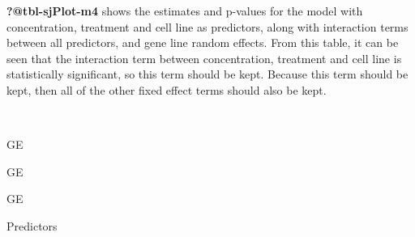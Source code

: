 \documentclass[
  letterpaper,
  DIV=11,
  numbers=noendperiod]{scrartcl}
\begin{document}
\textbf{?@tbl-sjPlot-m4} shows the estimates and p-values for the model
with concentration, treatment and cell line as predictors, along with
interaction terms between all predictors, and gene line random effects.
From this table, it can be seen that the interaction term between
concentration, treatment and cell line is statistically significant, so
this term should be kept. Because this term should be kept, then all of
the other fixed effect terms should also be kept.

\begin{table}

\caption{\textbf{?(caption)}}\begin{minipage}[t]{\linewidth}

{\centering 

~

}

\end{minipage}%
\newline
\begin{minipage}[t]{\linewidth}

{\centering 

GE

}

\end{minipage}%
\newline
\begin{minipage}[t]{\linewidth}

{\centering 

GE

}

\end{minipage}%
\newline
\begin{minipage}[t]{\linewidth}

{\centering 

GE

}

\end{minipage}%
\newline
\begin{minipage}[t]{\linewidth}

{\centering 

Predictors

}

\end{minipage}%
\newline
\begin{minipage}[t]{\linewidth}

{\centering 

}
\end{minipage}
\end{table}
\end{document}
